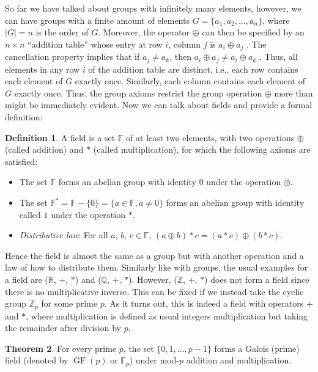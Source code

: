 \documentclass{Resources/UoBLab1}
\theoremstyle{definition}
\newtheorem{theorem}{Theorem}[section]
\newtheorem{definition}[theorem]{Definition}
\begin{document}
So far we have talked about groups with infinitely many elements, however, we can have groups with a finite amount of elements $G = \{a_1 , a_2, ..., a_n\}$, where $|G| = n$ is the order of $G$. Moreover, the operator $\oplus$ can then be specified by an $n \times n$ “addition table” whose entry at row $i$, column $j$ is $a_i \oplus a_j$ . The cancellation property implies that if $a_j \ne a_k$, then $a_i \oplus a_j \ne a_i \oplus a_k$ . Thus, all elements in any row $i$ of the addition table are distinct, i.e., each row contains each element of $G$ exactly once. Similarly, each column contains each element of $G$ exactly once. Thus, the group axioms restrict the group operation $\oplus$ more than might be immediately evident. Now we can talk about fields and provide a formal definition:
\begin{definition}
    A field is a set $\mathbb{F}$ of at least two elements, with two operations $\oplus$ (called addition) and $*$ (called multiplication), for which the following axioms are satisfied:
    \begin{itemize}
        \item The set $\mathbb{F}$ forms an abelian group with identity $0$ under the operation $\oplus$.
        \item The set $\mathbb{F}^* = \mathbb{F} - \{0\} = \{a \in \mathbb{F}, a \ne 0\}$ forms an abelian group with identity called $1$ under the operation $*$.
        \item \textit{Distributive law}: For all $a$, $b$, $c \in \mathbb{F}$, $(a \oplus b) * c = (a * c) \oplus (b * c)$.
    \end{itemize}
\end{definition}
Hence the field is almost the same as a group but with another operation and a law of how to distribute them. Similarly like with groups, the usual examples for a field are ($\mathbb{R}$, $+$, $*$) and ($\mathbb{Q}$, $+$, $*$). However, ($\mathbb{Z}$, $+$, $*$) does not form a field since there is no multiplicative inverse. This can be fixed if we instead take the cyclic group $\mathbb{Z}_p$ for some prime $p$. As it turns out, this is indeed a field with operators $+$ and $*$, where multiplication is defined as usual integers multiplication but taking the remainder after division by $p$.
\begin{theorem}
    For every prime $p$, the set $\{0, 1, ... , p - 1\}$ forms a Galois (prime) field (denoted by $\operatorname{GF}(p)$ or $\mathbb{F}_p$) under mod-$p$ addition and multiplication.
\end{theorem}
\end{document}
